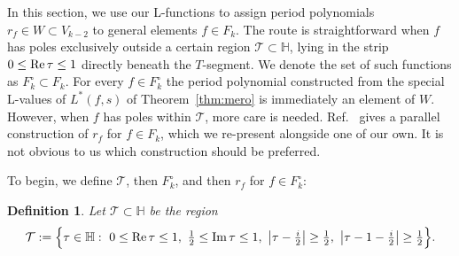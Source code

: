 \documentclass[11pt]{article}
\newtheorem{definition}[theorem]{Definition}
\newcommand{\HH}{\mathbb{H}}
\begin{document}
In this section, we use our L-functions to assign period polynomials $r_f \in W \subset V_{k-2}$ to
general elements $f \in F_k$. The route is straightforward when $f$ has poles exclusively outside a
certain region $\mathcal{T}\subset\HH$, lying in the strip $0\le{\rm Re}\,\tau\le1$ directly beneath
the $T$-segment. We denote the set of such functions as $F_k^\circ \subset F_k$. For every
$f \in F_k^\circ$ the period polynomial constructed from the special L-values of $L^*(f,s)$ of
Theorem~\ref{thm:mero} is immediately an element of $W$. However, when $f$ has poles within
$\mathcal{T}$, more care is needed. Ref.~\cite{BrownFonseca2025} gives a parallel construction of
$r_f$ for $f \in F_k$, which we re-present alongside one of our own. It is not obvious to us
which construction should be preferred.

To begin, we define $\mathcal{T}$, then $F_k^\circ$, and then $r_f$ for $f \in F_k^\circ$:

\begin{definition}\label{def:Tri}
Let $\mathcal{T}\subset\HH$ be the region
\begin{equation}\label{eq:Tri}
\mathcal{T}:=\Big\{\tau\in\HH:\ 0\le{\rm Re}\,\tau\le1,\ \tfrac12\le{\rm Im}\,\tau\le1,\
\big|\tau-\tfrac{i}{2}\big|\ge\tfrac12,\ \big|\tau-1-\tfrac{i}{2}\big|\ge\tfrac12\Big\}.
\end{equation}
\end{definition}
\end{document}
